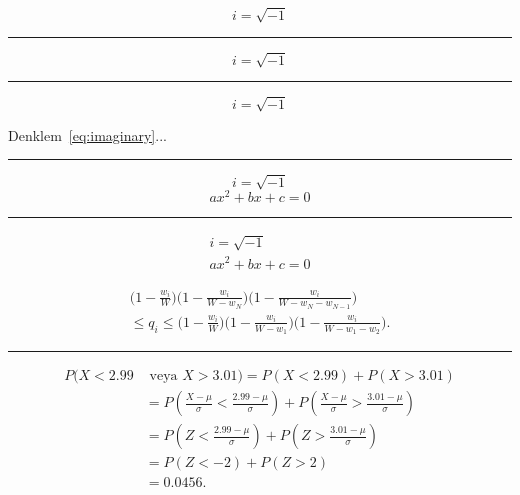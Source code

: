 \documentclass{article}
\begin{document}

\lipsum[1][1-3]
\[ i = \sqrt{-1} \] %
\lipsum[1][4-6]

\bigskip
\hrule
\bigskip

\lipsum[1][1-3]

\[ i = \sqrt{-1} \]

\lipsum[1][4-6]

\bigskip
\hrule
\bigskip

\lipsum[1][1-3]
\begin{equation} \label{eq:imaginary}
i = \sqrt{-1}
\end{equation}
\lipsum[1][4-6]

Denklem~\eqref{eq:imaginary}...

\bigskip
\hrule
\bigskip

\lipsum[1][1-3]
\[ i = \sqrt{-1} \]
\[ ax^2 + bx + c = 0 \]
\lipsum[1][4-6]

\bigskip
\hrule
\bigskip

\lipsum[1][1-3]
\begin{gather*}
i = \sqrt{-1} \\ 
ax^2 + bx + c = 0 %
\end{gather*}
\lipsum[1][4-6]

\newpage


\lipsum[1][1-3]
\begin{multline*}
\Big( 1 - \frac{w_i}{W} \Big) \Big( 1 - \frac{w_i}{W - w_N} \Big) \Big( 1 - \frac{w_i}{W - w_N - w_{N - 1}} \Big) \\
\leq q_i \leq \Big( 1 - \frac{w_i}{W} \Big) \Big( 1 - \frac{w_i}{W - w_1} \Big) \Big( 1 - \frac{w_i}{W - w_1 - w_2} \Big).
\end{multline*}
\lipsum[1][4-6]

\bigskip
\hrule
\bigskip

\lipsum[1][1-3]
\begin{align*}
P(X < \num{2,99} & \text{ veya } X > \num{3,01}) = P(X < \num{2,99}) + P(X > \num{3,01}) \\
&= P\left(\frac{X-\mu}{\sigma} < \frac{\num{2,99}-\mu}{\sigma}\right) + P\left(\frac{X-\mu}{\sigma} > \frac{\num{3,01}-\mu}{\sigma}\right) \\
&= P\left(Z < \frac{\num{2,99}-\mu}{\sigma}\right) + P\left(Z > \frac{\num{3,01}-\mu}{\sigma}\right) \\
&= P(Z < -2) + P(Z > 2) \\
&= \num{0,0456}.
\end{align*}
\lipsum[1][4-6]
\end{document}

